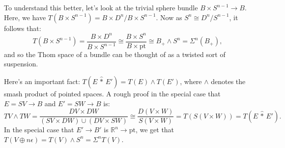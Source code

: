 \documentclass{article}
\newcommand{\R}{\mathbb{R}}
\newcommand{\sprod}{\wedge}
\newcommand{\wsum}{\vee}
\newcommand{\pt}[1]{#1_+}
\newcommand{\ptspace}{\mathrm{pt}}
\newcommand{\Suspend}{\Sigma}
\begin{document}
To understand this better, let's look at the trivial sphere bundle $B \times S^{n-1} \to B$.  Here, we have $T(B \times S^{n-1}) = B \times D^n / B \times S^{n-1}$.  Now as $S^n\cong D^n/S^{n-1}$, it follows that:
\[T(B \times S^{n-1}) = \frac{B \times D^n}{B \times S^{n-1}} \cong \frac{B \times S^n}{B \times \ptspace} \cong \pt{B} \sprod S^n = \Suspend^n(\pt{B}),\]
and so the Thom space of a bundle can be thought of as a twisted sort of suspension.

Here's an important fact: $T(E\, \widehat \ast\, E') = T(E) \sprod T(E')$, where $\sprod$ denotes the smash product of pointed spaces.  A rough proof in the special case that $E = SV \to B$ and $E' = SW \to B$ is:
\[TV \sprod TW = \frac{DV \times DW}{(SV \times DW) \cup (DV \times SW)}\cong \frac{D(V \times W)}{S(V \times W)}= T(S(V \times W)) = T(E\,\widehat \ast\, E').\]
In the special case that $E' \to B'$ is $\R^n \to \ptspace$, we get that $T(V \oplus n \epsilon) = T(V) \sprod S^n = \Suspend^n T(V)$.
\end{document}

